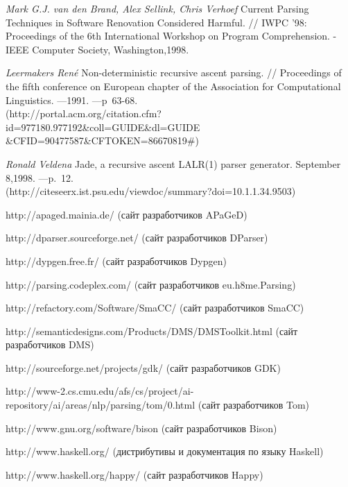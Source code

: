 \begin{thebibliography}{50}
         \emph{Mark G.J. van den Brand, Alex Sellink, Chris Verhoef} 
                Current Parsing Techniques in Software Renovation Considered Harmful. // IWPC '98: Proceedings of the 6th International Workshop on Program Comprehension. - IEEE Computer Society, Washington,1998.                

         \emph {Leermakers Ren\'{e}} Non-deterministic recursive ascent parsing. // Proceedings of the fifth conference on European chapter of the Association for Computational Linguistics. ---1991. ---p~63-68. 
         \\(http://portal.acm.org/citation.cfm?id=977180.977192\&coll=GUIDE\&dl=GUIDE\\\&CFID=90477587\&CFTOKEN=86670819\#) 	 


         \emph {Ronald Veldena} Jade, a recursive ascent LALR(1) parser generator. September 8,1998.  ---p.~12. 
        \\(http://citeseerx.ist.psu.edu/viewdoc/summary?doi=10.1.1.34.9503) 




         http://apaged.mainia.de/ (сайт разработчиков APaGeD)

         http://dparser.sourceforge.net/ (сайт разработчиков DParser)

         http://dypgen.free.fr/  (сайт разработчиков Dypgen)

         http://parsing.codeplex.com/ (сайт разработчиков eu.h8me.Parsing)

         http://refactory.com/Software/SmaCC/ (сайт разработчиков SmaCC)

         http://semanticdesigns.com/Products/DMS/DMSToolkit.html (сайт разработчиков DMS)

         http://sourceforge.net/projects/gdk/ (сайт разработчиков GDK)

               http://www-2.cs.cmu.edu/afs/cs/project/ai-repository/ai/areas/nlp/parsing/tom/0.html (сайт разработчиков Tom)

            http://www.gnu.org/software/bison (сайт разработчиков Bison)

          http://www.haskell.org/ (дистрибутивы и документация по языку Haskell)

            http://www.haskell.org/happy/ (сайт разработчиков Happy)


\end{thebibliography}

